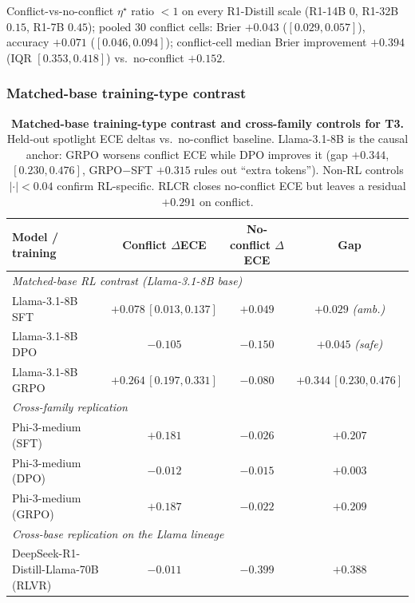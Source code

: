 Conflict-vs-no-conflict $\eta^\star$ ratio $<\!1$ on every
R1-Distill scale (R1-14B $0$, R1-32B $0.15$, R1-7B $0.45$); pooled
$30$ conflict cells: Brier $+0.043$ ($[0.029,0.057]$), accuracy
$+0.071$ ($[0.046,0.094]$); conflict-cell median Brier improvement
$+0.394$ (IQR $[0.353,0.418]$) vs.\ no-conflict $+0.152$.

\subsubsection{Matched-base training-type contrast}
\label{app:matched-base}

\begin{table}[H]
\centering\small
\caption{\textbf{Matched-base training-type contrast and cross-family
controls for T3.}  Held-out spotlight ECE deltas vs.\ no-conflict
baseline.  Llama-3.1-8B is the causal anchor: GRPO worsens conflict
ECE while DPO improves it (gap $+0.344$, $[0.230,0.476]$,
GRPO$-$SFT $+0.315$ rules out ``extra tokens'').  Non-RL controls
$|\cdot|\!<\!0.04$ confirm RL-specific.  RLCR closes no-conflict
ECE but leaves a residual $+0.291$ on conflict.}
\label{tab:matched-base-training-type}
\setlength{\tabcolsep}{2pt}
\scriptsize
\begin{tabular}{lccc}
\toprule
\textbf{Model / training} & \textbf{Conflict $\Delta$ECE} & \textbf{No-conflict $\Delta$ECE} & \textbf{Gap}\\
\midrule
\multicolumn{4}{l}{\emph{Matched-base RL contrast (Llama-3.1-8B base)}}\\
Llama-3.1-8B SFT     & $+0.078\,[0.013,0.137]$ & $+0.049$ & $+0.029$ \emph{(amb.)}\\
Llama-3.1-8B DPO     & $-0.105$ & $-0.150$ & $+0.045$ \emph{(safe)}\\
Llama-3.1-8B GRPO    & $+0.264\,[0.197,0.331]$ & $-0.080$ & $\mathbf{+0.344\,[0.230,0.476]}$\\
\midrule
\multicolumn{4}{l}{\emph{Cross-family replication}}\\
Phi-3-medium (SFT)                   & $+0.181$ & $-0.026$ & $+0.207$\\
Phi-3-medium (DPO)                   & $-0.012$ & $-0.015$ & $+0.003$\\
Phi-3-medium (GRPO)                  & $+0.187$ & $-0.022$ & $\mathbf{+0.209}$\\
\midrule
\multicolumn{4}{l}{\emph{Cross-base replication on the Llama lineage}}\\
DeepSeek-R1-Distill-Llama-70B (RLVR) & $-0.011$ & $-0.399$ & $\mathbf{+0.388}$\\

\end{tabular}
\end{table}

